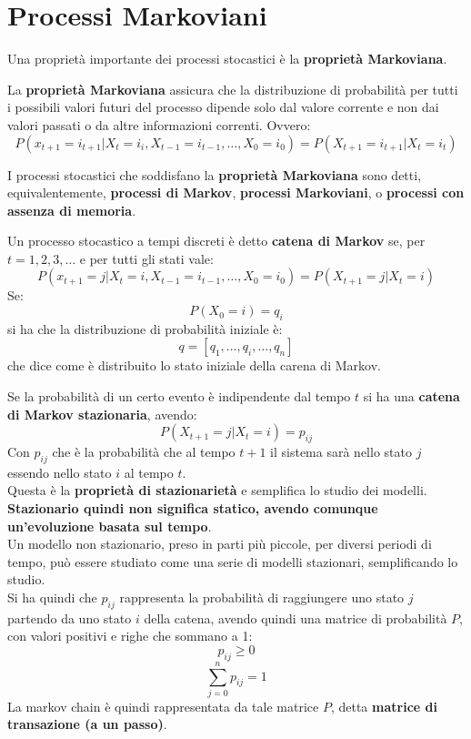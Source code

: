 \documentclass[a4paper,12pt, oneside]{book}
\begin{document}
\section{Processi Markoviani}
Una proprietà importante dei processi stocastici è la \textbf{proprietà
  Markoviana}.
\begin{definizione}
  La \textbf{proprietà Markoviana} assicura che la distribuzione di probabilità
  per tutti i possibili valori futuri del processo dipende solo dal valore
  corrente e non dai valori passati o da altre informazioni correnti. Ovvero:
  \[P(x_{t+1}=i_{t+1}|X_t=i_i, X_{t-1}=i_{t-1},\ldots,
    X_0=i_0)=P(X_{t+1}=i_{t+1}|X_t=i_t)\] 
\end{definizione}
\begin{definizione}
  I processi stocastici che soddisfano la \textbf{proprietà Markoviana} sono
  detti, equivalentemente, \textbf{processi di Markov}, \textbf{processi
    Markoviani}, o \textbf{processi con assenza di memoria}. 
\end{definizione}
\begin{definizione}
  Un processo stocastico a tempi discreti è detto \textbf{catena di Markov} se,
  per $t=1,2,3,\ldots$ e per tutti gli stati vale:
  \[P(x_{t+1}=j|X_t=i, X_{t-1}=i_{t-1},\ldots,
    X_0=i_0)=P(X_{t+1}=j|X_t=i)\]
  Se:
  \[P(X_0=i)=q_i\]
  si ha che la distribuzione di probabilità iniziale è:
  \[q=[q_1,\ldots, q_i,\ldots, q_n]\]
  che dice come è distribuito lo stato iniziale della carena di Markov.
\end{definizione}
\begin{definizione}
  Se la probabilità di un certo evento è indipendente dal tempo $t$ si ha una
  \textbf{catena di Markov stazionaria}, avendo:
  \[P(X_{t+1}=j|X_t=i)=p_{ij}\]
  Con $p_{ij}$ che è la probabilità che al tempo $t+1$ il sistema sarà nello
  stato $j$ essendo nello stato $i$ al tempo $t$.\\
  Questa è la \textbf{proprietà di stazionarietà} e semplifica lo studio dei
  modelli. 
  \textbf{Stazionario quindi non significa statico, avendo comunque
    un'evoluzione basata sul tempo}.\\
  Un modello non stazionario, preso in parti più piccole, per diversi periodi di
  tempo, può essere studiato come una serie di modelli stazionari,
  semplificando lo studio. \\
  Si ha quindi che $p_{ij}$ rappresenta la probabilità di raggiungere uno stato
  $j$ partendo da uno stato $i$ della catena, avendo quindi una matrice di
  probabilità $P$, con valori positivi e righe che sommano a 1:
  \[p_{ij}\geq 0\]
  \[\sum_{j=0}^n p_{ij}=1\]
  La markov chain è quindi rappresentata da tale matrice $P$, detta
  \textbf{matrice di transazione (a un passo)}.
\end{definizione}
\end{document}
